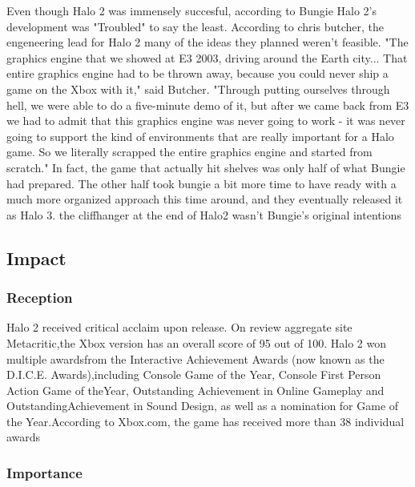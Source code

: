 \documentclass[a4paper,10pt]{book}
\begin{document}
          Even though Halo 2 was immensely succesful, according to Bungie Halo 2's development was "Troubled" to say the least. According  to chris butcher, the engeneering lead for Halo 2
          many of the ideas they planned weren't feasible. "The graphics engine that we showed at E3 2003, driving around the Earth city... That entire graphics engine had to be thrown away,
          because you could never ship a game on the Xbox with it," said Butcher. "Through putting ourselves through hell, we were able to do a five-minute demo of it, but after we came back from E3
          we had to admit that this graphics engine was never going to work - it was never going to support the kind of environments that are really important for a Halo game. So we literally scrapped
          the entire graphics engine and started from scratch." In fact, the game that actually hit shelves was only half of what Bungie had prepared. The other half took bungie a bit more time 
          to have ready with a much more organized approach this time around, and they eventually released it as Halo 3. the cliffhanger at the end of Halo2 wasn't Bungie's original intentions
         
 
 \subsection{Impact }
 
 \subsubsection{Reception }
 
          Halo 2 received critical acclaim upon release.  On review aggregate site Metacritic,the Xbox version has an overall score of 95 out of 100. 
          Halo 2 won multiple awardsfrom the Interactive Achievement Awards (now known as the D.I.C.E. Awards),including Console Game of the Year, Console First Person Action Game of theYear,
          Outstanding Achievement in Online Gameplay and OutstandingAchievement in Sound Design, as well as a nomination for Game of the Year.According to Xbox.com, the game has received more than 38 individual awards
         
 
 \subsubsection{Importance }
 
\end{document}
